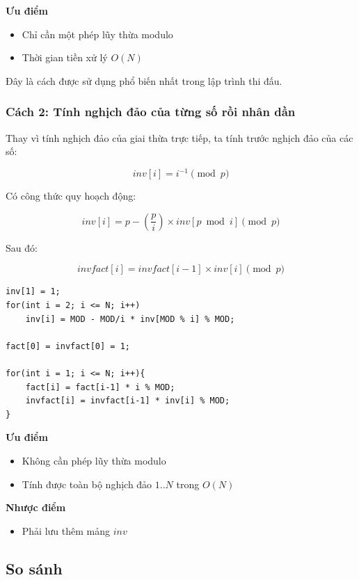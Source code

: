 \textbf{Ưu điểm}

\begin{itemize}
\item Chỉ cần một phép lũy thừa modulo
\item Thời gian tiền xử lý $O(N)$
\end{itemize}

Đây là cách được sử dụng phổ biến nhất trong lập trình thi đấu.

\subsubsection*{Cách 2: Tính nghịch đảo của từng số rồi nhân dần}

Thay vì tính nghịch đảo của giai thừa trực tiếp, ta tính trước nghịch đảo của các số:

\[
inv[i] = i^{-1} \pmod p
\]

Có công thức quy hoạch động:

\[
inv[i] = p - \left(\frac{p}{i}\right) \times inv[p \bmod i] \pmod p
\]

Sau đó:

\[
invfact[i] = invfact[i-1] \times inv[i] \pmod p
\]

\begin{tcolorbox}
\begin{verbatim}
inv[1] = 1;
for(int i = 2; i <= N; i++)
    inv[i] = MOD - MOD/i * inv[MOD % i] % MOD;

fact[0] = invfact[0] = 1;

for(int i = 1; i <= N; i++){
    fact[i] = fact[i-1] * i % MOD;
    invfact[i] = invfact[i-1] * inv[i] % MOD;
}
\end{verbatim}
\end{tcolorbox}

\textbf{Ưu điểm}

\begin{itemize}
\item Không cần phép lũy thừa modulo
\item Tính được toàn bộ nghịch đảo $1..N$ trong $O(N)$
\end{itemize}

\textbf{Nhược điểm}

\begin{itemize}
\item Phải lưu thêm mảng $inv$
\end{itemize}

\subsection*{So sánh}

